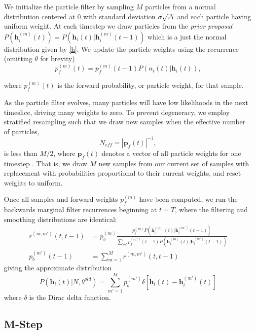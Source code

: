 \documentclass{article}
\begin{document}
We initialize the particle filter by sampling $M$ particles from a
normal distribution centered at 0 with standard deviation
$\sigma\sqrt{\Delta}$ and each particle having uniform weight. At each timestep we draw
particles from the \emph{prior proposal}
$P(\mathbf{h}_i^{(m)}(t)) = P(\mathbf{h}_i(t) | \mathbf{h}_i^{(m)}(t - 1))$
which is a just the normal distribution given by \eqref{h}. We update
the particle weights using the recurrence (omitting $\theta$ for brevity)
\begin{equation} \label{pf}
p_f^{(m)}(t) = p_f^{(m)}(t - 1)P(n_i(t) | \mathbf{h}_i(t)),
\end{equation}

where $p_f^{(m)}(t)$ is the forward probability, or particle weight, for that sample.

As the particle filter evolves, many particles will have low
likelihoods in the next timeslice, driving many weights to zero.
To prevent degeneracy, we employ stratified resampling such that we draw new samples when the effective number of particles,
\begin{equation} \label{Neff}
N_{eff} = \left|\mathbf{p}_f(t)\right|^{-1},
\end{equation}
is less than $M/2$, where $\mathbf{p}_f(t)$ denotes a vector of all
particle weights for one timestep \citep{volgelstein2009}. That is,
we draw $M$ new samples from our current set of samples with
replacement with probabilities proportional to their current weights,
and reset weights to uniform.

Once all samples and forward weights $p_f^{(m)}$ have been computed,
we run the backwards marginal filter recurrences beginning at $t=T$,
where the filtering and smoothing distributions are identical:
\begin{align}
r^{(m,m')}(t, t - 1) &= p_b^{(m)}\frac{p_f^{(m)}P(\mathbf{h}_i^{(m)}(t)|\mathbf{h}_i^{(m')}(t - 1))}{\sum_{m'} p_f^{(m')}(t - 1) P(\mathbf{h}_i^{(m)}(t)|\mathbf{h}_i^{(m')}(t - 1))} \\
p_b^{(m')}(t - 1)    &= \sum_{m=1}^M r^{(m,m')}(t, t - 1)
\end{align}
giving the approximate distribution
\begin{equation} \label{Ph}
P(\mathbf{h}_i(t) | N, \theta^{old}) = \sum_{m'=1}^{M} p_b^{(m')} \delta\left[\mathbf{h}_i(t) - \mathbf{h}_i^{(m')}(t)\right]
\end{equation}
where $\delta$ is the Dirac delta function.

\subsection{M-Step}
\end{document}
